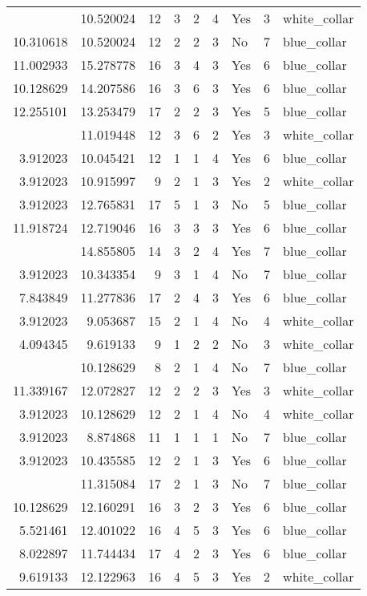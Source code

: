 \documentclass[
]{article}
\begin{document}
\begin{longtable}[t]{rrrrrllrl}
\addlinespace
8.022897 & 10.520024 & 12 & 3 & 2 & 4 & Yes & 3 & white\_collar\\
10.310618 & 10.520024 & 12 & 2 & 2 & 3 & No & 7 & blue\_collar\\
11.002933 & 15.278778 & 16 & 3 & 4 & 3 & Yes & 6 & blue\_collar\\
10.128629 & 14.207586 & 16 & 3 & 6 & 3 & Yes & 6 & blue\_collar\\
12.255101 & 13.253479 & 17 & 2 & 2 & 3 & Yes & 5 & blue\_collar\\
\addlinespace
7.803843 & 11.019448 & 12 & 3 & 6 & 2 & Yes & 3 & white\_collar\\
3.912023 & 10.045421 & 12 & 1 & 1 & 4 & Yes & 6 & blue\_collar\\
3.912023 & 10.915997 & 9 & 2 & 1 & 3 & Yes & 2 & white\_collar\\
3.912023 & 12.765831 & 17 & 5 & 1 & 3 & No & 5 & blue\_collar\\
11.918724 & 12.719046 & 16 & 3 & 3 & 3 & Yes & 6 & blue\_collar\\
\addlinespace
14.403325 & 14.855805 & 14 & 3 & 2 & 4 & Yes & 7 & blue\_collar\\
3.912023 & 10.343354 & 9 & 3 & 1 & 4 & No & 7 & blue\_collar\\
7.843849 & 11.277836 & 17 & 2 & 4 & 3 & Yes & 6 & blue\_collar\\
3.912023 & 9.053687 & 15 & 2 & 1 & 4 & No & 4 & white\_collar\\
4.094345 & 9.619133 & 9 & 1 & 2 & 2 & No & 3 & white\_collar\\
\addlinespace
3.912023 & 10.128629 & 8 & 2 & 1 & 4 & No & 7 & blue\_collar\\
11.339167 & 12.072827 & 12 & 2 & 2 & 3 & Yes & 3 & white\_collar\\
3.912023 & 10.128629 & 12 & 2 & 1 & 4 & No & 4 & white\_collar\\
3.912023 & 8.874868 & 11 & 1 & 1 & 1 & No & 7 & blue\_collar\\
3.912023 & 10.435585 & 12 & 2 & 1 & 3 & Yes & 6 & blue\_collar\\
\addlinespace
3.912023 & 11.315084 & 17 & 2 & 1 & 3 & No & 7 & blue\_collar\\
10.128629 & 12.160291 & 16 & 3 & 2 & 3 & Yes & 6 & blue\_collar\\
5.521461 & 12.401022 & 16 & 4 & 5 & 3 & Yes & 6 & blue\_collar\\
8.022897 & 11.744434 & 17 & 4 & 2 & 3 & Yes & 6 & blue\_collar\\
9.619133 & 12.122963 & 16 & 4 & 5 & 3 & Yes & 2 & white\_collar\\

\end{longtable}
\end{document}
